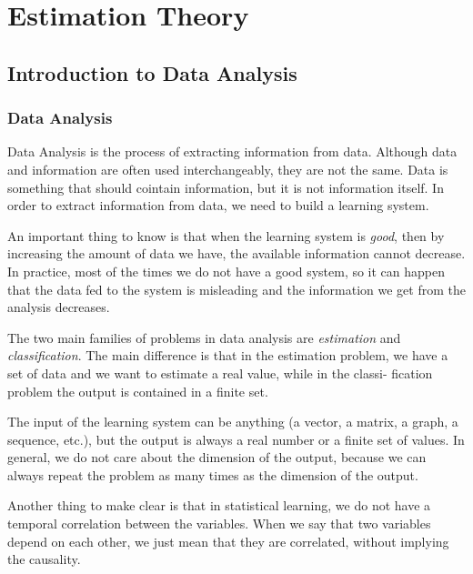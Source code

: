 \chapter{Estimation Theory}
\section{Introduction to Data Analysis}
\subsection{Data Analysis}
Data Analysis is the process of extracting information from data. Although data and information are often used interchangeably, they are not the same. Data is something that should cointain information, but it is not information itself. In order to extract information from data, we need to build a learning system.

An important thing to know is that when the learning system is \textit{good}, then by increasing the amount of data we have, the available information cannot decrease. In practice, most of the times we do not have a good system, so it can happen that the data fed to the system is misleading and the information we get from the analysis decreases.

The two main families of problems in data analysis are \textit{estimation} and \textit{classification}. The main difference is that in the estimation problem,
we have a set of data and we want to estimate a real value, while in the classi-
fication problem the output is contained in a finite set.

The input of the learning system can be anything (a vector, a matrix, a graph, a sequence,
etc.), but the output is always a real number or a finite set of values. In general,
we do not care about the dimension of the output, because we can always repeat
the problem as many times as the dimension of the output.

Another thing to make clear is that in statistical learning, we do not have a temporal correlation between the variables. When we say that two variables depend on each other, we just mean that they are correlated, without implying the causality.


